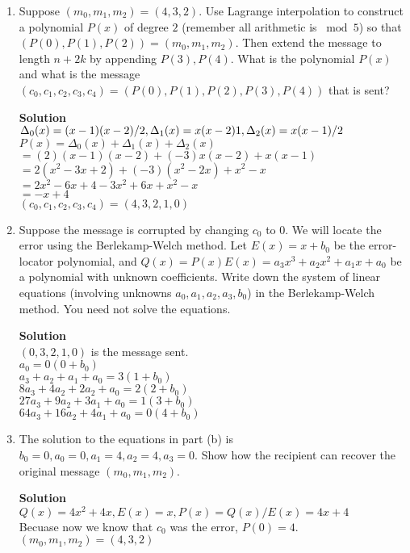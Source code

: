 \documentclass[11pt]{article}
\newenvironment{Parts}{\begin{enumerate}[label=(\alph*)]}{\end{enumerate}}
\newcommand*{\Part}{\item}
\begin{document}
\begin{Parts}
    \renewcommand{\labelenumi}{(\alph{enumi})}
    \Part Suppose $(m_0,m_1,m_2) = (4,3,2)$.  Use Lagrange interpolation to
    construct a polynomial $P(x)$ of degree $2$ (remember all arithmetic is $\bmod
    5$) so that $(P(0),P(1),P(2)) = (m_0,m_1,m_2)$.  Then extend the message to
    length $n+2k$ by appending $P(3),P(4)$.  What is the polynomial $P(x)$ and
    what is the message $(c_0,c_1,c_2,c_3,c_4) = (P(0),P(1),P(2),P(3),P(4))$ that
    is sent?
\begin{mdframed} \textbf{Solution} \\
$\Delta_0(x)=(x-1)(x-2)/2, \Delta_1(x)=x(x-2)\-1, \Delta_2(x)=x(x-1)/2$ \\
$P(x)=\Delta_0(x)+\Delta_1(x)+\Delta_2(x)$ \\
$=(2)(x-1)(x-2)+(-3)x(x-2)+x(x-1)$ \\
$=2(x^2-3x+2)+(-3)(x^2-2x)+x^2-x$ \\
$=2x^2-6x+4-3x^2+6x+x^2-x$ \\
$=-x+4$ \\
$(c_0,c_1,c_2,c_3,c_4) = (4,3,2,1,0)$
\end{mdframed}

    \Part Suppose the message is corrupted by changing $c_0$ to $0$.  We will
    locate the error using the Berlekamp-Welch method.  Let $E(x) = x + b_0$ be
    the error-locator polynomial, and $Q(x) = P(x)E(x) = a_3x^3 + a_2x^2 + a_1x +
    a_0$ be a polynomial with unknown coefficients.  Write down the system of
    linear equations (involving unknowns $a_0,a_1,a_2,a_3,b_0$) in the
    Berlekamp-Welch method.  You need not solve the equations.
\begin{mdframed} \textbf{Solution} \\
$(0,3,2,1,0)$ is the message sent. \\
$a_0=0(0+b_0)$ \\
$a_3+a_2+a_1+a_0=3(1+b_0)$ \\
$8a_3+4a_2+2a_2+a_0=2(2+b_0)$ \\
$27a_3+9a_2+3a_1+a_0=1(3+b_0)$ \\
$64a_3+16a_2+4a_1+a_0=0(4+b_0)$ 
\end{mdframed}

    \Part The solution to the equations in part (b) is $b_0 = 0, a_0 = 0, a_1 = 4,
    a_2 = 4, a_3 = 0$.  Show how the recipient can recover the original message
    $(m_0,m_1,m_2)$.
\begin{mdframed} \textbf{Solution} \\
$Q(x)=4x^2+4x, E(x)=x, P(x)=Q(x)/E(x)=4x+4$ \\
Becuase now we know that $c_0$ was the error, $P(0)=4$. \\
$(m_0,m_1,m_2)=(4,3,2)$
\end{mdframed}
\end{Parts}
\end{document}
